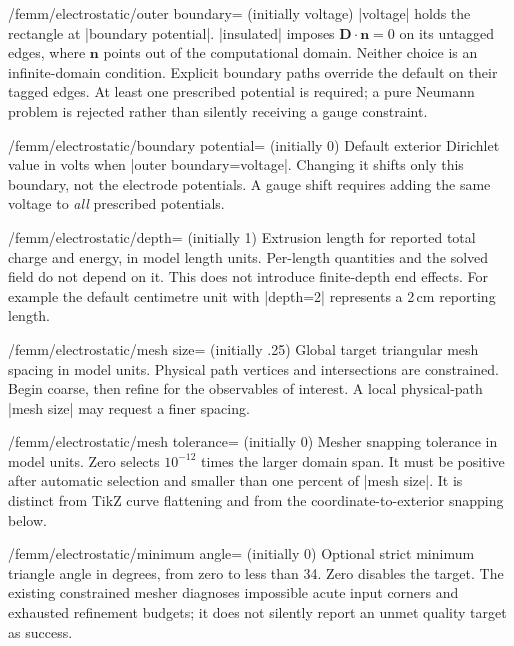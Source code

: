 \begin{key}{/femm/electrostatic/outer boundary= (initially voltage)}
|voltage| holds the rectangle at |boundary potential|. |insulated| imposes
$\mathbf D\cdot\mathbf n=0$ on its untagged edges, where $\mathbf n$ points
out of the computational domain. Neither choice is an infinite-domain condition.
Explicit boundary paths override the default on their tagged edges. At least
one prescribed potential is required; a pure Neumann problem is rejected rather
than silently receiving a gauge constraint.
\end{key}
\begin{key}{/femm/electrostatic/boundary potential= (initially 0)}
Default exterior Dirichlet value in volts when |outer boundary=voltage|.
Changing it shifts only this boundary, not the electrode potentials. A gauge
shift requires adding the same voltage to \emph{all} prescribed potentials.
\end{key}
\begin{key}{/femm/electrostatic/depth= (initially 1)}
Extrusion length for reported total charge and energy, in model length units.
Per-length quantities and the solved field do not depend on it. This does not
introduce finite-depth end effects. For example the default centimetre unit
with |depth=2| represents a 2\,cm reporting length.
\end{key}
\begin{key}{/femm/electrostatic/mesh size= (initially .25)}
Global target triangular mesh spacing in model units. Physical path vertices
and intersections are constrained. Begin coarse, then refine for the observables
of interest. A local physical-path |mesh size| may request a finer spacing.
\end{key}
\begin{key}{/femm/electrostatic/mesh tolerance= (initially 0)}
Mesher snapping tolerance in model units. Zero selects $10^{-12}$ times the
larger domain span. It must be positive after automatic selection and smaller
than one percent of |mesh size|. It is distinct from TikZ curve flattening and
from the coordinate-to-exterior snapping below.
\end{key}
\begin{key}{/femm/electrostatic/minimum angle= (initially 0)}
Optional strict minimum triangle angle in degrees, from zero to less than 34.
Zero disables the target. The existing constrained mesher diagnoses impossible
acute input corners and exhausted refinement budgets; it does not silently
report an unmet quality target as success.
\end{key}
